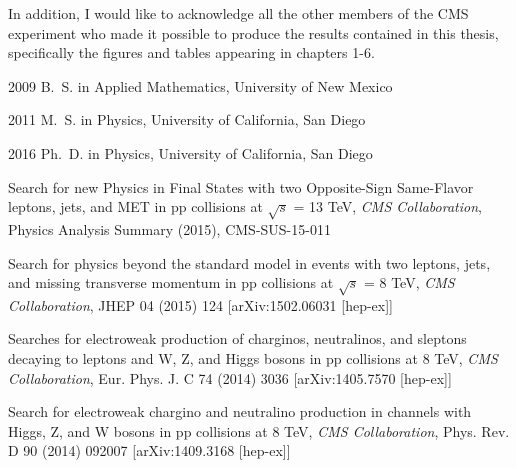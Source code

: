 \begin{frontmatter}
\begin{acknowledgements}
In addition, I would like to acknowledge all the other members of the CMS experiment who made it possible to produce
the results contained in this thesis, specifically the figures and tables appearing in chapters 1-6.

\end{acknowledgements}                                                         

\begin{vitapage}                                                               
\begin{vita}                                                                   
  \item[2009] B.~S. in Applied Mathematics, University of New Mexico
  \item[2011] M.~S. in Physics, University of California, San Diego
  \item[2016] Ph.~D. in Physics, University of California, San Diego       
\end{vita}                                                                     
\begin{publications}                                                           
\item Search for new Physics in Final States with two Opposite-Sign Same-Flavor leptons, jets, and MET in pp collisions at $\sqrt{s}$ = 13 TeV, {\it CMS Collaboration}, Physics Analysis Summary (2015), CMS-SUS-15-011 
\item Search for physics beyond the standard model in events with two leptons, jets, and missing transverse momentum in pp collisions at $\sqrt{s}$ = 8 TeV, {\it CMS Collaboration}, JHEP 04 (2015) 124 [arXiv:1502.06031 [hep-ex]]
\item Searches for electroweak production of charginos, neutralinos, and sleptons decaying to leptons and W, Z, and Higgs bosons in pp collisions at 8 TeV, {\it CMS Collaboration}, Eur. Phys. J. C 74 (2014) 3036 [arXiv:1405.7570 [hep-ex]]
\item Search for electroweak chargino and neutralino production in channels with Higgs, Z, and W bosons in pp collisions at 8 TeV, {\it CMS Collaboration}, Phys. Rev. D 90 (2014) 092007 [arXiv:1409.3168 [hep-ex]]

\end{publications}                                                             
\end{vitapage}                                                                 
                                                                               


\end{frontmatter}
